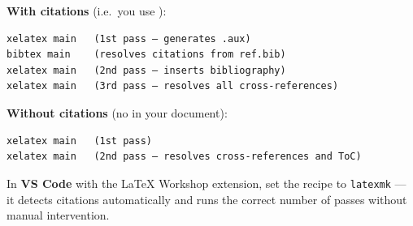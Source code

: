 \textbf{With citations} (i.e.\ you use \verb||):

\begin{verbatim}
xelatex main   (1st pass — generates .aux)
bibtex main    (resolves citations from ref.bib)
xelatex main   (2nd pass — inserts bibliography)
xelatex main   (3rd pass — resolves all cross-references)
\end{verbatim}

\textbf{Without citations} (no \verb|| in your document):

\begin{verbatim}
xelatex main   (1st pass)
xelatex main   (2nd pass — resolves cross-references and ToC)
\end{verbatim}

In \textbf{VS Code} with the LaTeX Workshop extension, set the recipe to
\texttt{latexmk} — it detects citations automatically and runs the correct
number of passes without manual intervention.

